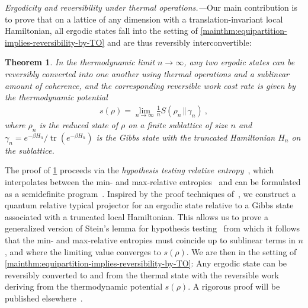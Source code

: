 \documentclass[prl,reprint,longbibliography,superscriptaddress]{revtex4-1}
\newcounter{thm}
\newtheorem{maintheorem}[thm]{Theorem}
\renewcommand\paragraph[1]{\par\emph{#1.---}\kern2pt\relax\ignorespaces}
\begin{document}
\paragraph{Ergodicity and reversibility under thermal operations}Our main contribution is to prove that on a lattice of any dimension with a
translation-invariant local Hamiltonian, all ergodic states fall into the
setting of \cref{mainthm:equipartition-implies-reversibility-by-TO} and are
thus reversibly interconvertible:

\begin{maintheorem}
  \label{mainthm:ergodic-state-has-thermo-potential}
  In the thermodynamic limit $n\to\infty$, any two ergodic states can be
  reversibly converted into one another using thermal operations and a sublinear
  amount of coherence, and the corresponding reversible work cost rate is given
  by the thermodynamic potential
  \begin{align}
    s(\rho) = \lim_{n\to\infty} \frac1n {S}(\rho_n\,\Vert\,\gamma_n)\ ,
    \label{eq:mainthm-ergodic-state-thermo-potential-KL-divergence}
  \end{align}
  where $\rho_n$ is the reduced state of $\rho$ on a finite sublattice of size
  $n$ and $\gamma_n = {e}^{-\beta H_n} / \operatorname{tr}({e}^{-\beta H_n})$ is the Gibbs
  state with the truncated Hamiltonian $H_n$ on the sublattice.
\end{maintheorem}

The proof of \cref{mainthm:ergodic-state-has-thermo-potential} proceeds via the
\emph{hypothesis testing relative entropy}~\cite{Buscemi2010IEEETIT_capacity,Brandao2011IEEETIT_oneshot,Wang2012PRL_oneshot,Matthews2014IEEETIT_blocklength,Tomamichel2013_hierarchy,Dupuis2013_DH}, which interpolates between the min- and max-relative
entropies~\cite{Dupuis2013_DH} and can be formulated as a semidefinite
program~\cite{Watrous2009_sdps}.  Inspired by the proof techniques of~\cite{Bjelakovic2003arXiv_revisted,Bjelakovic2005QIP_compression,Bjelakovic2004CMP_ergodic,Bjelakovic2004IM_lattice,Ogata2013LMP_shannonmcmillan}, we construct a quantum relative typical
projector for an ergodic state relative to a Gibbs state associated with a
truncated local Hamiltonian.  This allows us to prove a generalized version of
Stein's lemma for hypothesis testing~\cite{Hiai1991CMP_proper,Ogawa2000IEEETIT_Stein,Bjelakovic2003arXiv_revisted,Bjelakovic2004CMP_ergodic,Brandao2010CMP_Stein} from which it follows that the min- and max-relative
entropies must coincide up to sublinear terms in $n$, and where the limiting
value converges to $s(\rho)$.
We are then in the setting of
\cref{mainthm:equipartition-implies-reversibility-by-TO}: Any ergodic state can
be reversibly converted to and from the thermal state with the reversible work
deriving from the thermodynamic potential $s(\rho)$.
A rigorous proof will be published elsewhere~\cite{Sagawa-CMP-inprep}.
\end{document}
